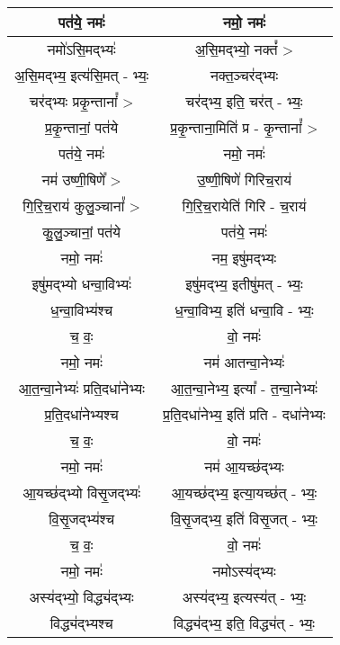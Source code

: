 {\begin{longtable}{|c|c|}
\hline
पत॑ये॒ नमः॑                    & नमो॒ नमः॑ \\
\hline
नमो॑ऽसि॒मद्भ्यः॑                & अ॒सि॒मद्भ्यो॒ नक्तं᳚ > \\
\hline
अ॒सि॒मद्भ्य॒ इत्य॑सि॒मत् - भ्यः॒      & नक्त॒ञ्चर॑द्भ्यः \\
\hline
चर॑द्भ्यः प्रकृ॒न्तानां᳚ >          & चर॑द्भ्य॒ इति॒ चर॑त् - भ्यः॒ \\
\hline
प्र॒कृ॒न्तानां॒ पत॑ये               & प्र॒कृ॒न्ताना॒मिति॑ प्र - कृ॒न्तानां᳚ > \\
\hline
पत॑ये॒ नमः॑                    & नमो॒ नमः॑ \\
\hline
नम॑ उष्णी॒षिणे᳚ >               & उ॒ष्णी॒षिणे॑ गिरिच॒राय॑ \\
\hline
गि॒रि॒च॒राय॑ कुलु॒ञ्चानां᳚ >         & गि॒रि॒च॒रायेति॑ गिरि - च॒राय॑ \\
\hline
कु॒लु॒ञ्चानां॒ पत॑ये                & पत॑ये॒ नमः॑ \\
\hline
नमो॒ नमः॑                    & नम॒ इषु॑मद्भ्यः \\
\hline
इषु॑मद्भ्यो धन्वा॒विभ्यः॑          & इषु॑मद्भ्य॒ इतीषु॑मत् - भ्यः॒ \\
\hline
ध॒न्वा॒विभ्य॑श्च                 & ध॒न्वा॒विभ्य॒ इति॑ धन्वा॒वि - भ्यः॒ \\
\hline
च॒ वः॒                       & वो॒ नमः॑ \\
\hline
नमो॒ नमः॑                    & नम॑ आतन्वा॒नेभ्यः॑ \\
\hline
आ॒त॒न्वा॒नेभ्यः॑ प्रति॒दधा॑नेभ्यः      & आ॒त॒न्वा॒नेभ्य॒ इत्या᳚ - त॒न्वा॒नेभ्यः॑ \\
\hline
प्र॒ति॒दधा॑नेभ्यश्च               & प्र॒ति॒दधा॑नेभ्य॒ इति॑ प्रति - दधा॑नेभ्यः \\
\hline
च॒ वः॒                       & वो॒ नमः॑ \\
\hline
नमो॒ नमः॑                    & नम॑ आ॒यच्छ॑द्भ्यः \\
\hline
आ॒यच्छ॑द्भ्यो विसृ॒जद्भ्यः॑          & आ॒यच्छ॑द्भ्य॒ इत्या॒यच्छ॑त् - भ्यः॒ \\
\hline
वि॒सृ॒जद्भ्य॑श्च                  & वि॒सृ॒जद्भ्य॒ इति॑ विसृ॒जत् - भ्यः॒ \\
\hline
च॒ वः॒                       & वो॒ नमः॑ \\
\hline
नमो॒ नमः॑                    & नमोऽस्य॑द्भ्यः \\
\hline
अस्य॑द्भ्यो॒ विद्ध्य॑द्भ्यः          & अस्य॑द्भ्य॒ इत्यस्य॑त् - भ्यः॒ \\
\hline
विद्ध्य॑द्भ्यश्च                 & विद्ध्य॑द्भ्य॒ इति॒ विद्ध्य॑त् - भ्यः॒ \\

\end{longtable}}
